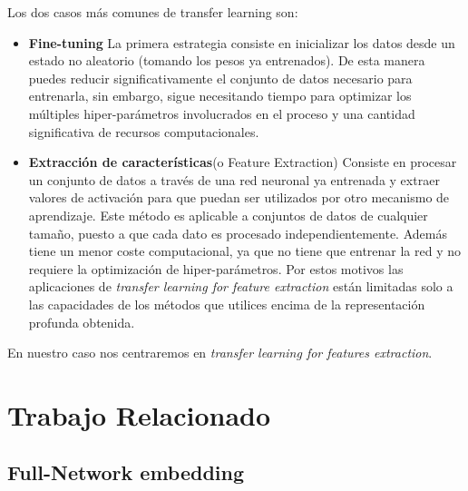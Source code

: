 \documentclass[12,twoside]{TFG-GM}
\theoremstyle{definition}
\theoremstyle{remark}
\begin{document}
Los dos casos más comunes de transfer learning son: 

\begin{itemize}
\item \textbf{Fine-tuning} La primera estrategia consiste en inicializar los datos desde un estado no aleatorio (tomando los pesos ya entrenados). 
De esta manera puedes reducir significativamente el conjunto de datos necesario para entrenarla, sin embargo, sigue necesitando tiempo para optimizar los múltiples hiper-parámetros involucrados en el proceso y una cantidad significativa de recursos computacionales. 


\item\textbf{Extracción de características}(o Feature Extraction)  Consiste en procesar un conjunto de datos a través de una red neuronal ya entrenada y extraer valores de activación para que puedan ser utilizados por otro mecanismo de aprendizaje. Este método es aplicable a conjuntos de datos de cualquier tamaño, puesto a que cada dato es procesado independientemente. Además tiene un menor coste computacional, ya que no tiene que entrenar la red y no requiere la optimización de hiper-parámetros. Por estos motivos las aplicaciones de \textit{transfer learning for feature extraction} están limitadas solo a las  capacidades de los métodos que utilices encima de la representación profunda obtenida. 


\end{itemize}

En nuestro caso nos centraremos en \textit{transfer learning for features extraction}. 




\newpage

\section{Trabajo Relacionado}

\subsection{Full-Network embedding}
\end{document}
